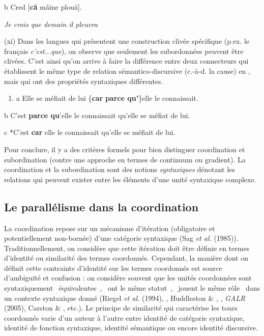   b  Cred [\textbf{că} mâine plouă].

{\itshape
Je crois que demain il pleuvra}

(xi) Dans les langues qui présentent une construction clivée spécifique (p.ex. le français \textit{c'est...que}), on observe que seulement les subordonnées peuvent être clivées. C'est ainsi qu'on arrive à faire la différence entre deux connecteurs qui établissent le même type de relation sémantico-discursive (c.-à-d. la cause) en , mais qui ont des propriétés syntaxiques différentes.


\begin{enumerate}
\item \label{bkm:Ref300265540}a  Elle se méfiait de lui \{\textbf{car} {\textbar} \textbf{parce qu'}\}elle le connaissait.


\end{enumerate}
  b  C'est \textbf{parce qu}'elle le connaissait qu'elle se méfiat de lui.

  c  *C'est \textbf{car} elle le connaissait qu'elle se méfiait de lui.

Pour conclure, il y a des critères formels pour bien distinguer coordination et subordination (contre une approche en termes de continuum ou gradient). La coordination et la subordination sont des notions \textit{syntaxiques} dénotant les relations qui peuvent exister entre les éléments d'une unité syntaxique complexe.

\subsection{Le parallélisme dans la coordination}
\label{bkm:Ref301814089}La coordination repose sur un mécanisme d'itération (obligatoire et potentiellement non-bornée) d'une catégorie syntaxique (Sag \textit{et al.} (1985)). Traditionnellement, on considère que cette itération doit être définie en termes d'identité ou similarité des termes coordonnés. Cependant, la manière dont on définit cette contrainte d'identité sur les termes coordonnés est source d'ambiguïté et confusion : on considère souvent que les unités coordonnées sont syntaxiquement {\guillemotleft}~équivalentes~{\guillemotright}, {\guillemotleft}~ont le même statut~{\guillemotright}, {\guillemotleft}~jouent le même rôle~{\guillemotright} dans un contexte syntaxique donné (Riegel \textit{et al.} (1994), \citet{Dik1997}, Huddleston \& \citet{Pullum2002}, \citet{Haspelmath2004}, \textit{GALR} (2005), Carston \& \citet{Blakemore2005}, etc.). Le principe de similarité qui caractérise les tours coordonnés varie d'un auteur à l'autre entre identité de catégorie syntaxique, identité de fonction syntaxique, identité sémantique ou encore identité discursive. 

